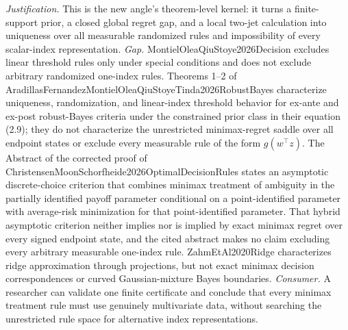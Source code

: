 \documentclass{article}
\begin{document}
\par\smallskip\noindent \textit{Justification.} This is the new angle's theorem-level kernel: it turns a finite-support prior, a closed global regret gap, and a local two-jet calculation into uniqueness over all measurable randomized rules and impossibility of every scalar-index representation. \textit{Gap.} MontielOleaQiuStoye2026Decision excludes linear threshold rules only under special conditions and does not exclude arbitrary randomized one-index rules. Theorems 1--2 of AradillasFernandezMontielOleaQiuStoyeTinda2026RobustBayes characterize uniqueness, randomization, and linear-index threshold behavior for ex-ante and ex-post robust-Bayes criteria under the constrained prior class in their equation (2.9); they do not characterize the unrestricted minimax-regret saddle over all endpoint states or exclude every measurable rule of the form \(g(w^{\top}z)\). The Abstract of the corrected proof of ChristensenMoonSchorfheide2026OptimalDecisionRules states an asymptotic discrete-choice criterion that combines minimax treatment of ambiguity in the partially identified payoff parameter conditional on a point-identified parameter with average-risk minimization for that point-identified parameter. That hybrid asymptotic criterion neither implies nor is implied by exact minimax regret over every signed endpoint state, and the cited abstract makes no claim excluding every arbitrary measurable one-index rule. ZahmEtAl2020Ridge characterizes ridge approximation through projections, but not exact minimax decision correspondences or curved Gaussian-mixture Bayes boundaries. \textit{Consumer.} A researcher can validate one finite certificate and conclude that every minimax treatment rule must use genuinely multivariate data, without searching the unrestricted rule space for alternative index representations.
\end{document}

